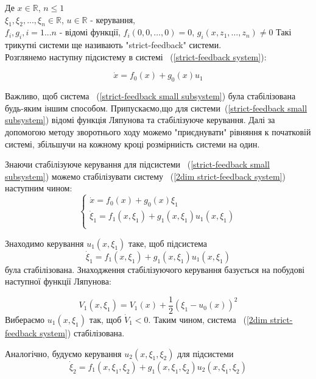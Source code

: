 \documentclass{article}
\begin{document}
Де $x \in \mathbb{R}$, $n \leq 1$\\
$\xi_1, \xi_2, ... ,\xi_n \in \mathbb{R}$, $u \in \mathbb{R}$ - керування,\\ 
$f_i, g_i, i = 1 ... n $ -  відомі функції, $f_i(0,0, \dots, 0) = 0$, 
$g_i(x,z_1, \dots, z_n) \neq 0$
Такі трикутні системи ще називають "strict-feedback" системи.\\
Розглянемо наступну підсистему в системі ~(\ref{strict-feedback system}):

\begin{equation} \label{strict-feedback small subsystem}
\dot x = f_0(x)+g_0(x)u_1
\end{equation}

Важливо, щоб система ~(\ref{strict-feedback small subsystem}) була стабілізована будь-яким іншим способом.
Припускаємо,що для системи~(\ref{strict-feedback small subsystem}) 
відомі функція Ляпунова та стабілізуюче керування.
Далі за допомогою методу зворотнього ходу можемо "приєднувати" рівняння к початковій системі, 
збільшучи на кожному кроці розмірниість системи на один. 

Знаючи стабілізуюче керування для підсистеми  ~(\ref{strict-feedback small subsystem})
можемо стабілізувати систему ~(\ref{2dim strict-feedback system}) наступним чином:
\begin{equation} \label{2dim strict-feedback system}
    \begin{cases}
    \dot x = f_0(x)+g_0(x)\xi_1\\
    \dot \xi_1 = f_1(x,\xi_1)+g_1(x,\xi_1)u_1(x,\xi_1)\\
    \end{cases}
\end{equation}

Знаходимо керування $u_1(x,\xi_1)$ таке, щоб підсистема
\begin{equation}
    \dot \xi_1 = f_1(x,\xi_1)+g_1(x,\xi_1)u_1(x,\xi_1)
\end{equation}
була стабілізована. Знаходження стабілізуючого керування базується на побудові наступної функції Ляпунова:

\begin{equation}
V_{1}(x,\xi_1)=V_{1}(x)+{\frac{1}{2}}(\xi_1-u_{0}(x))^{2}
\end{equation}
Вибераємо $u_1(x,\xi_1)$ так, щоб $\dot V_{1} < 0$.
Таким чином, система ~(\ref{2dim strict-feedback system}) стабілізована.
 
Аналогічно, будуємо керування $u_{2}(x,\xi_{1},\xi_{2})$
для підсистеми 
\begin{equation*}
    \dot \xi_2 = f_1(x,\xi_1,\xi_2)+g_1(x, \xi_1, \xi_2)u_2(x,\xi_1, \xi_2)
\end{equation*} 
\end{document}
